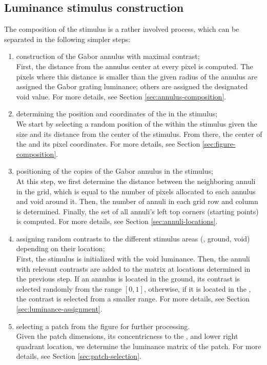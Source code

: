 \subsection{Luminance stimulus construction}
\label{sec:luminance-stim-construction}

The composition of the stimulus is a rather involved process, which can be separated in the following simpler steps:
\begin{enumerate}
    \item construction of the Gabor annulus with maximal contrast; \\
    First, the distance from the annulus center at every pixel is computed. The pixels where this distance is smaller than the given radius of the annulus are assigned the Gabor grating luminance; others are assigned the designated void value. For more details, see Section \ref{sec:annulus-composition}.
    
    \item determining the position and coordinates of the \stimfig{} in the stimulus; \\
    We start by selecting a random position of the \stimfig{} within the stimulus given the \stimfig{} size and its distance from the center of the stimulus. From there, the center of the \stimfig{} and its pixel coordinates. For more details, see Section \ref{sec:figure-composition}.
    
    \item positioning of the copies of the Gabor annulus in the stimulus; \\
    At this step, we first determine the distance between the neighboring annuli in the grid, which is equal to the number of pixels allocated to each annulus and void around it. Then, the number of annuli in each grid row and column is determined. Finally, the set of all annuli's left top corners (starting points) is computed. For more details, see Section \ref{sec:annuli-locations}.
    
    \item assigning random contrasts to the different stimulus areas (\stimfig, ground, void) depending on their location; \\
    First, the stimulus is initialized with the void luminance. Then, the annuli with relevant contrasts are added to the matrix at locations determined in the previous step. If an annulus is located in the
    ground, its contrast is selected randomly from the range $[0, 1]$, otherwise, if it is located in the \stimfig, the contrast is selected from a smaller range. For more details, see Section \ref{sec:luminance-assignment}.
    
    \item selecting a patch from the figure for further processing. \\
    Given the patch dimensions, its concentricness to the \stimfig, and lower right quadrant location, we determine the luminance matrix of the patch.
    For more details, see Section \ref{sec:patch-selection}.
\end{enumerate}


